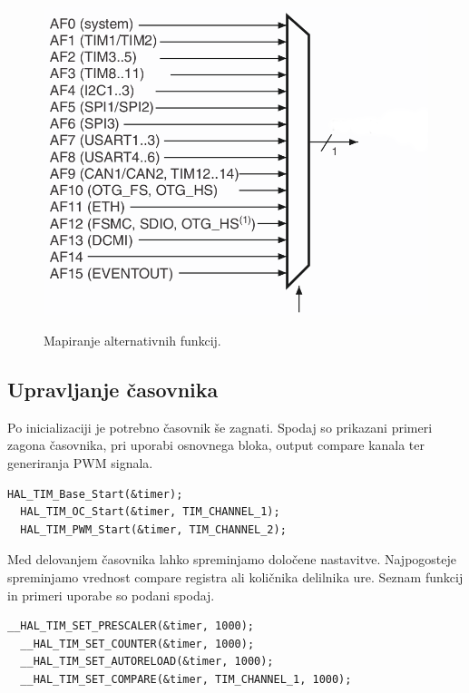\documentclass[12pt,letterpaper]{article}
\begin{document}
\begin{figure}[ht!]
  \centering
  \caption{Mapiranje alternativnih funkcij.}
  \includegraphics{images/vaja5/SPI_AF.png}
  \label{SPI_AF}
\end{figure}

\subsection*{Upravljanje časovnika}

Po inicializaciji je potrebno časovnik še zagnati. Spodaj so prikazani primeri zagona časovnika, pri uporabi osnovnega bloka, output compare kanala ter generiranja PWM signala.

\begin{center}
\begin{lstlisting}[style=CStyle]
  HAL_TIM_Base_Start(&timer);
  HAL_TIM_OC_Start(&timer, TIM_CHANNEL_1);
  HAL_TIM_PWM_Start(&timer, TIM_CHANNEL_2);
\end{lstlisting}
\end{center}

Med delovanjem časovnika lahko spreminjamo določene nastavitve. Najpogosteje spreminjamo vrednost compare registra ali količnika delilnika ure. Seznam funkcij in primeri uporabe so podani spodaj.

\begin{center}
\begin{lstlisting}[style=CStyle]
  __HAL_TIM_SET_PRESCALER(&timer, 1000);
  __HAL_TIM_SET_COUNTER(&timer, 1000);
  __HAL_TIM_SET_AUTORELOAD(&timer, 1000);
  __HAL_TIM_SET_COMPARE(&timer, TIM_CHANNEL_1, 1000);
\end{lstlisting}
\end{center}
\end{document}
